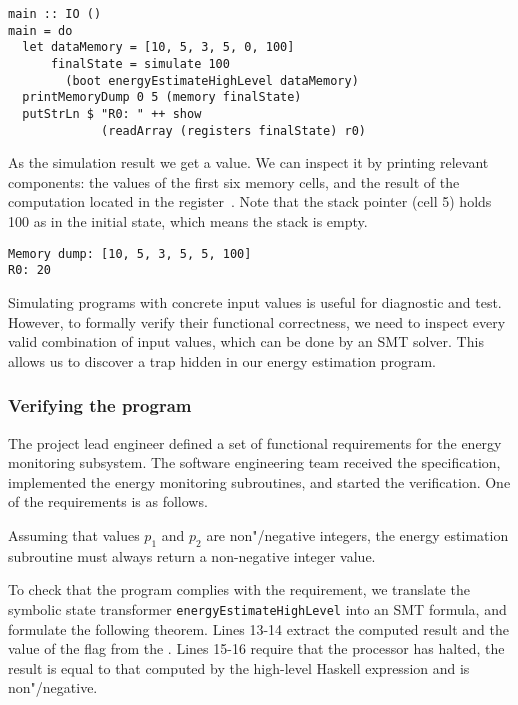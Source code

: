 \begin{verbatim}
main :: IO ()
main = do
  let dataMemory = [10, 5, 3, 5, 0, 100]
      finalState = simulate 100
        (boot energyEstimateHighLevel dataMemory)
  printMemoryDump 0 5 (memory finalState)
  putStrLn $ "R0: " ++ show
             (readArray (registers finalState) r0)
\end{verbatim}

\noindent
As the simulation result we get a  value. We can inspect it by
printing relevant components: the values of the first six memory cells, and the
result of the computation located in the register~. Note that the stack
pointer (cell 5) holds 100 as in the initial state, which means the stack is empty.


\begin{verbatim}
Memory dump: [10, 5, 3, 5, 5, 100]
R0: 20
\end{verbatim}


Simulating programs with concrete input values is useful for diagnostic and test.
However, to formally verify their functional correctness, we need to inspect
every valid combination of input values, which can be done by an SMT solver.
This allows us to discover a trap hidden in our energy estimation program.


\subsubsection{Verifying the program}
The project lead engineer defined a set of functional requirements for the
energy monitoring subsystem. The software engineering team received the
specification, implemented the energy monitoring subroutines, and started the
verification. One of the requirements is as follows.

\begin{tcolorbox}

Assuming that values $p_1$ and $p_2$ are non"/negative integers, the energy
estimation subroutine must always return a non-negative integer value.

\end{tcolorbox}

To check that the program complies with the requirement, we translate the
symbolic state transformer \texttt{energyEstimateHighLevel}
into an SMT formula,
and formulate the following theorem. Lines 13-14 extract the computed result and
the value of the flag  from the . Lines 15-16 require that
the processor has halted, the result is equal to that computed by the high-level
Haskell expression  and is non"/negative.


